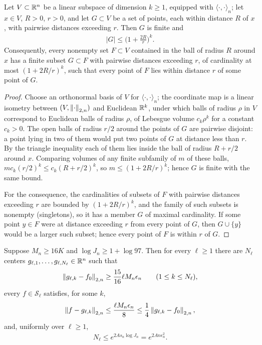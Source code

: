 \begin{auxlemma}\label{lem:packing}
Let $V\subset\mathbb{R}^n$ be a linear subspace of dimension $k\geq1$, equipped with $\langle\cdot,\cdot\rangle_n$; let $x\in V$, $R>0$, $r>0$, and let $G\subset V$ be a set of points, each within distance $R$ of $x$, with pairwise distances exceeding $r$. Then $G$ is finite and
\begin{align*}
|G|\leq\Big(1+\frac{2R}{r}\Big)^k .
\end{align*}
Consequently, every nonempty set $F\subset V$ contained in the ball of radius $R$ around $x$ has a finite subset $G\subset F$ with pairwise distances exceeding $r$, of cardinality at most $(1+2R/r)^k$, such that every point of $F$ lies within distance $r$ of some point of $G$.
\end{auxlemma}

\begin{proof}
Choose an orthonormal basis of $V$ for $\langle\cdot,\cdot\rangle_n$; the coordinate map is a linear isometry between $(V,\left\lVert \cdot \right\rVert_{2,n})$ and Euclidean $\mathbb{R}^k$, under which balls of radius $\rho$ in $V$ correspond to Euclidean balls of radius $\rho$, of Lebesgue volume $c_k\rho^k$ for a constant $c_k>0$. The open balls of radius $r/2$ around the points of $G$ are pairwise disjoint: a point lying in two of them would put two points of $G$ at distance less than $r$. By the triangle inequality each of them lies inside the ball of radius $R+r/2$ around $x$. Comparing volumes of any finite subfamily of $m$ of these balls, $mc_k(r/2)^k\leq c_k(R+r/2)^k$, so $m\leq(1+2R/r)^k$; hence $G$ is finite with the same bound.

For the consequence, the cardinalities of subsets of $F$ with pairwise distances exceeding $r$ are bounded by $(1+2R/r)^k$, and the family of such subsets is nonempty (singletons), so it has a member $G$ of maximal cardinality. If some point $y\in F$ were at distance exceeding $r$ from every point of $G$, then $G\cup\{y\}$ would be a larger such subset; hence every point of $F$ is within $r$ of $G$.
\end{proof}

\begin{auxlemma}\label{lem:covering}
Suppose $M_n\geq16K$ and $\log J_n\geq1+\log97$. Then for every $\ell\geq1$ there are $N_\ell$ centers $g_{\ell,1},\ldots,g_{\ell,N_\ell}\in\mathbb{R}^n$ such that
\begin{align}
\left\lVert g_{\ell,k}-f_0 \right\rVert_{2,n}\geq\frac{15}{16}\ell M_n\epsilon_n
\qquad(1\leq k\leq N_\ell),
\label{eq:center-away}
\end{align}
every $f\in\mathcal S_\ell$ satisfies, for some $k$,
\begin{align}
\left\lVert f-g_{\ell,k} \right\rVert_{2,n}\leq\frac{\ell M_n\epsilon_n}{8}\leq\frac14\left\lVert g_{\ell,k}-f_0 \right\rVert_{2,n},
\label{eq:center-close}
\end{align}
and, uniformly over $\ell\geq1$,
\begin{align}
N_\ell\leq e^{2As_n\log J_n}=e^{2An\epsilon_n^2}.
\label{eq:center-count}
\end{align}
\end{auxlemma}

